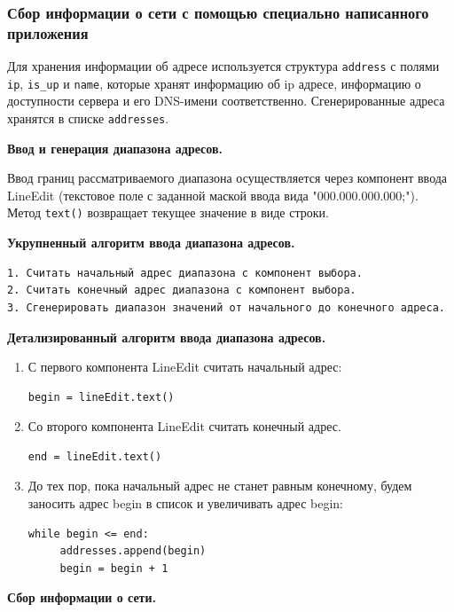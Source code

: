 \documentclass[a4paper]{article}
\begin{document}
	\subsubsection{Сбор информации о сети с помощью специально написанного приложения}
	
		Для хранения информации об адресе используется структура \texttt{address} с полями \texttt{ip}, \texttt{is\_up} и \texttt{name}, которые хранят информацию об ip адресе, информацию о доступности сервера и его DNS-имени соответственно. Сгенерированные адреса хранятся в списке \texttt{addresses}.
			
		\textbf{Ввод и генерация диапазона адресов.}
		
		Ввод границ рассматриваемого диапазона осуществляется через компонент ввода LineEdit (текстовое поле с заданной маской ввода вида "000.000.000.000;"). Метод \texttt{text()} возвращает текущее значение в виде строки. 
	
		\textbf{Укрупненный алгоритм ввода диапазона адресов.}

\begin{verbatim}
1. Считать начальный адрес диапазона с компонент выбора.
2. Считать конечный адрес диапазона с компонент выбора.
3. Сгенерировать диапазон значений от начального до конечного адреса.
\end{verbatim}

		\textbf{Детализированный алгоритм ввода диапазона адресов.}

		\begin{enumerate}
			 \item 
			 	С первого компонента LineEdit считать начальный адрес:
			 	\begin{verbatim}
begin = lineEdit.text()
				\end{verbatim}	
			 \item 
			 	Со второго компонента LineEdit считать конечный адрес.
			 	\begin{verbatim}
end = lineEdit.text()
				\end{verbatim}		
			\item
				До тех пор, пока начальный адрес не станет равным конечному, будем заносить адрес begin в список и увеличивать адрес begin:
				\begin{verbatim}
while begin <= end:
     addresses.append(begin)
     begin = begin + 1
				\end{verbatim} 	 	
		\end{enumerate}
		
		\textbf{Сбор информации о сети.}
		
\end{document}
